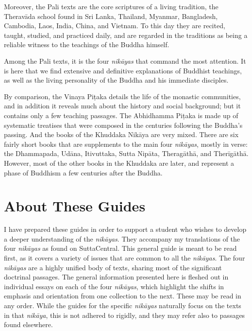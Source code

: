 \documentclass[12pt,openany]{book}%
\begin{document}
Moreover, the Pali texts are the core scriptures of a living tradition, the \textsanskrit{Theravāda} school found in Sri Lanka, Thailand, Myanmar, Bangladesh, Cambodia, Laos, India, China, and Vietnam. To this day they are recited, taught, studied, and practiced daily, and are regarded in the traditions as being a reliable witness to the teachings of the Buddha himself.

Among the Pali texts, it is the four \textit{\textsanskrit{nikāyas}} that command the most attention. It is here that we find extensive and definitive explanations of Buddhist teachings, as well as the living personality of the Buddha and his immediate disciples.

By comparison, the Vinaya \textsanskrit{Piṭaka} details the life of the monastic communities, and in addition it reveals much about the history and social background; but it contains only a few teaching passages. The Abhidhamma \textsanskrit{Piṭaka} is made up of systematic treatises that were composed in the centuries following the Buddha’s passing. And the books of the Khuddaka \textsanskrit{Nikāya} are very mixed. There are six fairly short books that are supplements to the main four \textit{\textsanskrit{nikāyas}}, mostly in verse: the Dhammapada, \textsanskrit{Udāna}, Itivuttaka, Sutta \textsanskrit{Nipāta}, \textsanskrit{Theragāthā}, and \textsanskrit{Therīgāthā}. However, most of the other books in the Khuddaka are later, and represent a phase of Buddhism a few centuries after the Buddha.

\section*{About These Guides}

I have prepared these guides in order to support a student who wishes to develop a deeper understanding of the \textit{\textsanskrit{nikāyas}}. They accompany my translations of the four \textit{\textsanskrit{nikāyas}} as found on SuttaCentral. This general guide is meant to be read first, as it covers a variety of issues that are common to all the \textit{\textsanskrit{nikāyas}}. The four \textit{\textsanskrit{nikāyas}} are a highly unified body of texts, sharing most of the significant doctrinal passages. The general information presented here is fleshed out in individual essays on each of the four \textit{\textsanskrit{nikāyas}}, which highlight the shifts in emphasis and orientation from one collection to the next. These may be read in any order. While the guides for the specific \textit{\textsanskrit{nikāyas}} naturally focus on the texts in that \textit{\textsanskrit{nikāya}}, this is not adhered to rigidly, and they may refer also to passages found elsewhere.
\end{document}
